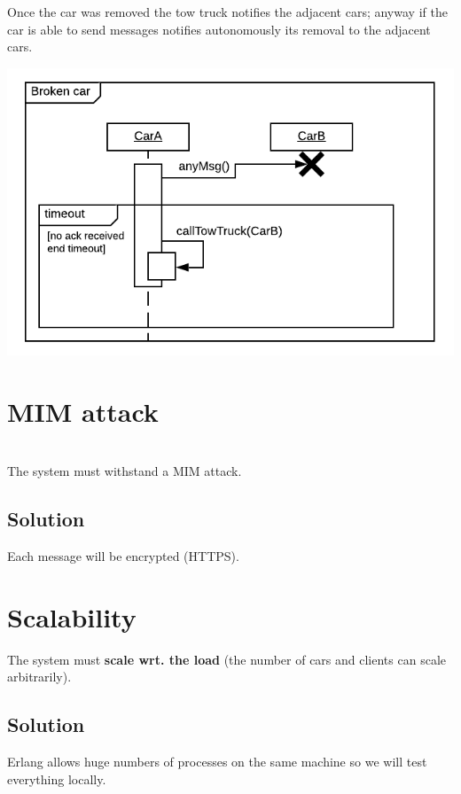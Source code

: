Once the car was removed the tow truck notifies the adjacent cars; anyway if the car
is able to send messages notifies autonomously its removal to the adjacent cars.


\begin{center}
    \includegraphics[scale=0.9]{assets/ds2019_4.png}
\end{center}


\section{MIM attack}
\\

\noindent
The system must withstand a MIM attack.


\subsection{Solution}

Each message will be encrypted (HTTPS).


\section{Scalability}

The system must \textbf{scale wrt. the load} 
(the number of cars and clients can scale arbitrarily).


\subsection{Solution}

Erlang allows huge numbers of processes on the same machine so we will 
test everything locally.\\

